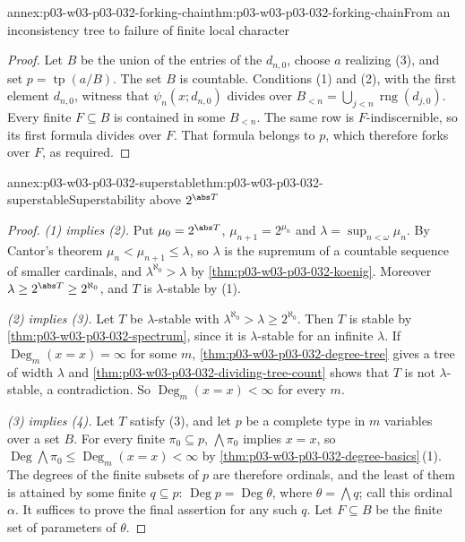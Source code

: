 \begin{annexitem}{annex:p03-w03-p03-032-forking-chain}{thm:p03-w03-p03-032-forking-chain}{From an inconsistency tree to failure of finite local character}
\begin{proof}
Let \(B\) be the union of the entries of the \(d_{n,0}\), choose \(a\)
realizing (3), and set \(p=\operatorname{tp}(a/B)\).  The set \(B\) is
countable.  Conditions (1) and (2), with the first element \(d_{n,0}\),
witness that \(\psi_n(x;d_{n,0})\) divides over
\(B_{<n}=\bigcup_{j<n}\operatorname{rng}(d_{j,0})\).  Every finite
\(F\subseteq B\) is contained in some \(B_{<n}\).  The same row is
\(F\)-indiscernible, so its first formula divides over \(F\).  That
formula belongs to \(p\), which therefore forks over \(F\), as required.
\end{proof}
\end{annexitem}


\begin{annexitem}{annex:p03-w03-p03-032-superstable}{thm:p03-w03-p03-032-superstable}{Superstability above \(2^{\abs T}\)}
\begin{proof}
\emph{(1) implies (2).}  Put \(\mu_0=2^{\abs T}\), \(\mu_{n+1}=2^{\mu_n}\)
and \(\lambda=\sup_{n<\omega}\mu_n\).  By Cantor's theorem
\(\mu_n<\mu_{n+1}\leq\lambda\), so \(\lambda\) is the supremum of a
countable sequence of smaller cardinals, and
\(\lambda^{\aleph_0}>\lambda\) by \cref{thm:p03-w03-p03-032-koenig}.
Moreover \(\lambda\geq2^{\abs T}\geq2^{\aleph_0}\), and \(T\) is
\(\lambda\)-stable by (1).

\emph{(2) implies (3).}  Let \(T\) be \(\lambda\)-stable with
\(\lambda^{\aleph_0}>\lambda\geq2^{\aleph_0}\).  Then \(T\) is stable by
\cref{thm:p03-w03-p03-032-spectrum}, since it is \(\lambda\)-stable for an
infinite \(\lambda\).  If \(\operatorname{Deg}_m(x=x)=\infty\) for some
\(m\), \cref{thm:p03-w03-p03-032-degree-tree} gives a tree of width
\(\lambda\) and \cref{thm:p03-w03-p03-032-dividing-tree-count} shows that
\(T\) is not \(\lambda\)-stable, a contradiction.  So
\(\operatorname{Deg}_m(x=x)<\infty\) for every \(m\).

\emph{(3) implies (4).}  Let \(T\) satisfy (3), and let \(p\) be a complete
type in \(m\) variables over a set \(B\).  For every finite
\(\pi_0\subseteq p\), \(\bigwedge\pi_0\) implies \(x=x\), so
\(\operatorname{Deg}\bigwedge\pi_0\leq\operatorname{Deg}_m(x=x)<\infty\) by
\cref{thm:p03-w03-p03-032-degree-basics}\,(1).  The degrees of the finite
subsets of \(p\) are therefore ordinals, and the least of them is attained
by some finite \(q\subseteq p\): \(\operatorname{Deg}p=
\operatorname{Deg}\theta\), where \(\theta=\bigwedge q\); call this ordinal
\(\alpha\).  It
suffices to prove the final assertion for any such \(q\).  Let \(F\subseteq
B\) be the finite set of parameters of \(\theta\).


\end{proof}
\end{annexitem}
